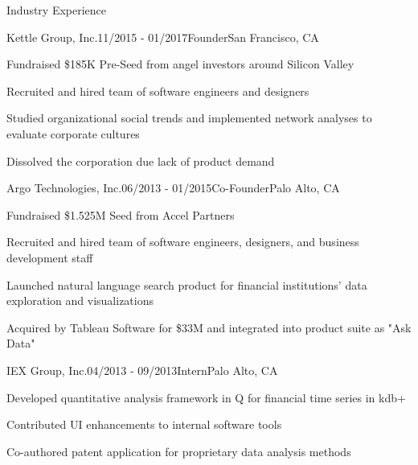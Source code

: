 \documentclass{cv} %
\begin{document}
\begin{cvSection}{Industry Experience}
\begin{cvSubsectionWork}{Kettle Group, Inc.}{11/2015 - 01/2017}{Founder}{San Francisco, CA}
\item Fundraised \$185K Pre-Seed from angel investors around Silicon Valley
\item Recruited and hired team of software engineers and designers
\item Studied organizational social trends and implemented network analyses to evaluate corporate cultures
\item Dissolved the corporation due lack of product demand
\end{cvSubsectionWork}


\begin{cvSubsectionWork}{Argo Technologies, Inc.}{06/2013 - 01/2015}{Co-Founder}{Palo Alto, CA}
\item Fundraised \$1.525M Seed from Accel Partners
\item Recruited and hired team of software engineers, designers, and business development staff
\item Launched natural language search product for financial institutions' data exploration and visualizations
\item Acquired by Tableau Software for \$33M and integrated into product suite as "Ask Data" 
\end{cvSubsectionWork}


\begin{cvSubsectionWork}{IEX Group, Inc.}{04/2013 - 09/2013}{Intern}{Palo Alto, CA}
\item Developed quantitative analysis framework in Q for financial time series in kdb+
\item Contributed UI enhancements to internal software tools 
\item Co-authored patent application for proprietary data analysis methods
\end{cvSubsectionWork}

\end{cvSection}

\end{document}

